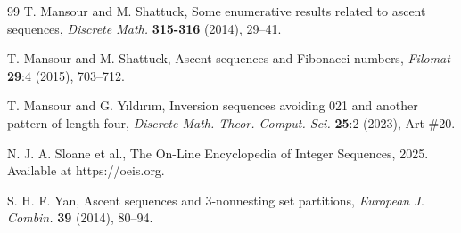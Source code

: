 \documentclass{article}
\theoremstyle{remark}
\theoremstyle{plain}
\begin{document}
\begin{thebibliography}{99}
T. Mansour and M. Shattuck, Some enumerative results related to ascent sequences, \emph{Discrete Math.} {\bf 315-316} (2014), 29--41.

T. Mansour and M. Shattuck, Ascent sequences and Fibonacci numbers, \emph{Filomat} {\bf29}:4 (2015), 703--712.

T. Mansour and G. Y{\i}ld{\i}r{\i}m, Inversion sequences avoiding 021 and another pattern of length four, \emph{Discrete Math. Theor. Comput. Sci.} {\bf25}:2 (2023), Art \#20.

N. J. A. Sloane et al., The On-Line Encyclopedia of Integer Sequences, 2025. Available at https://oeis.org.

S. H. F. Yan, Ascent sequences and 3-nonnesting set partitions, \emph{European J. Combin.} {\bf39} (2014), 80--94.


\end{thebibliography}
\end{document}
